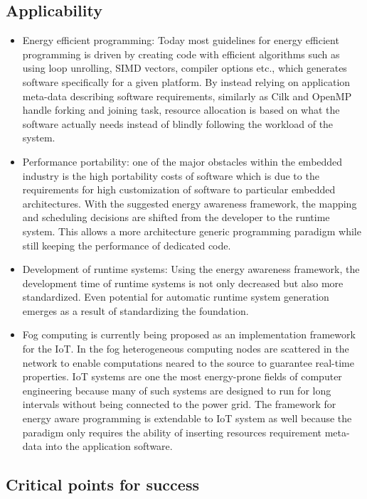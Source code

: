 \documentclass{article}
\begin{document}
\subsection{Applicability}
\begin{itemize}
 \item Energy efficient programming: Today most guidelines for energy efficient programming is driven by creating code with efficient algorithms such as using loop unrolling, SIMD vectors, compiler options etc., which generates software specifically for a given platform. 
 By instead relying on application meta-data describing software requirements, similarly as Cilk and OpenMP handle forking and joining task, resource allocation is based on what the software actually needs instead of blindly following the workload of the system.
 \item Performance portability: one of the major obstacles within the embedded industry is the high portability costs of software which is due to the requirements for high customization of software to particular embedded architectures. 
 With the suggested energy awareness framework, the mapping and scheduling decisions are shifted from the developer to the runtime system. 
 This allows a more architecture generic programming paradigm while still keeping the performance of dedicated code.
 \item Development of runtime systems: Using the energy awareness framework, the development time of runtime systems is not only decreased but also more standardized. 
 Even potential for automatic runtime system generation emerges as a result of standardizing the foundation.
 \item Fog computing is currently being proposed as an implementation framework for the IoT. 
 In the fog heterogeneous computing nodes are scattered in the network to enable computations neared to the source to guarantee real-time properties. 
 IoT systems are one the most energy-prone fields of computer engineering because many of such systems are designed to run for long intervals without being connected to the power grid. 
 The framework for energy aware programming is extendable to IoT system as well because the paradigm only requires the ability of inserting resources requirement meta-data into the application software. 
\end{itemize}

\subsection{Critical points for success}
\end{document}

